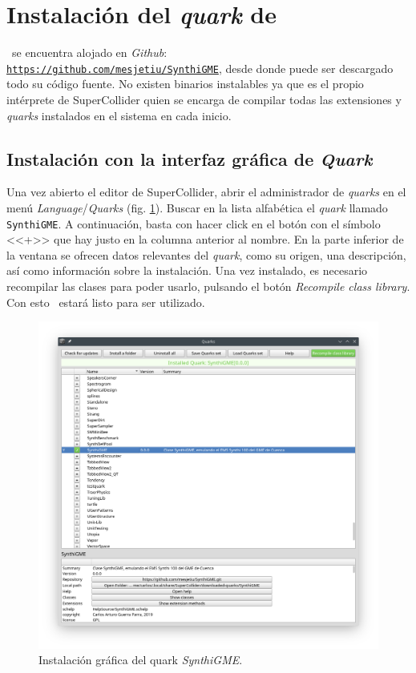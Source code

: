 \section[Instalación del \textit{quark}\dots]
{Instalación del \textit{quark} de \appName {}}


\appName~se encuentra alojado en \textit{Github}:\\ \href{https://github.com/mesjetiu/SynthiGME}{\texttt{https://github.com/mesjetiu/SynthiGME}}, desde donde puede ser descargado todo su código fuente. No existen binarios instalables ya que es el propio intérprete de SuperCollider quien se encarga de compilar todas las extensiones y \textit{quarks} instalados en el sistema en cada inicio.

\subsection{Instalación con la interfaz gráfica de \textit{Quark}}

Una vez abierto el editor de SuperCollider, abrir el administrador de \textit{quarks} en el menú \textit{Language}/\textit{Quarks} (fig. \ref{fig:quark_ide}). Buscar en la lista alfabética el \textit{quark} llamado \texttt{SynthiGME}. A continuación, basta con hacer click en el botón con el símbolo <<+>> que hay justo en la columna anterior al nombre. En la parte inferior de la ventana se ofrecen datos relevantes del \textit{quark}, como su origen, una descripción, así como información sobre la instalación. Una vez instalado, es necesario recompilar las clases para poder usarlo, pulsando el botón \textit{Recompile class library}. Con esto \appName~estará listo para ser utilizado.

\begin{figure}[H]
	\centering
	\includegraphics[width=1\textwidth]{quark_ide}
	\caption[Instalación gráfica del quark \texttt{SynthiGME}]{Instalación gráfica del quark \textit{SynthiGME}.}
	\label{fig:quark_ide}
\end{figure}


